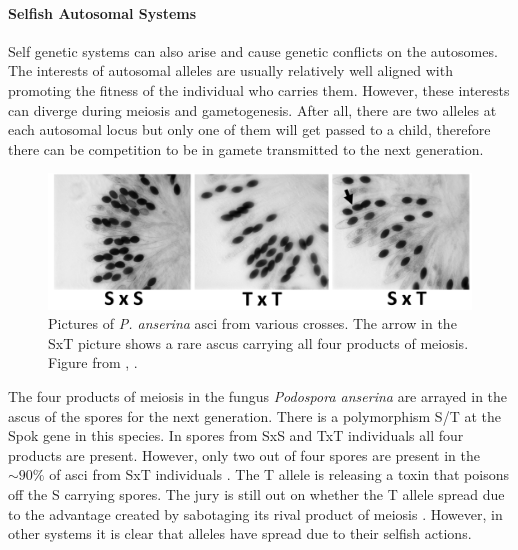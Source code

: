 {\paragraph{Selfish Autosomal Systems}
Self genetic systems can also arise and cause genetic conflicts on the
autosomes. The interests of autosomal alleles are usually relatively
well aligned with promoting the fitness of the individual who carries them. However, these interests can
diverge during meiosis and gametogenesis. After all, there are two
alleles at each autosomal locus but only one of them will get passed
to a child, therefore there can be competition to be in gamete transmitted to the next generation.
 \begin{figure}
\begin{center}
\includegraphics[width= \textwidth]{Journal_figs/single_locus_selection/ascus_spore_killer/Grognet_spore_killer.png}
\end{center}
\caption{
Pictures of {\it P. anserina} asci from various crosses. The arrow in the
SxT picture shows a rare  ascus carrying all four products of
meiosis. Figure from \citet{grognet2014genes}, \PLOSccBY. 
 } \label{fig:spore_killer}
\end{figure}
  

The four products of meiosis in the fungus {\it Podospora anserina}
are arrayed in the ascus
of the spores for the next generation. There is a polymorphism S/T at
the Spok gene in this species. In
spores from SxS and TxT individuals all four products are
present. However, only two out of four spores are present in the
$\sim 90\%$ of asci from SxT individuals \citep{grognet2014genes}. The T allele is releasing
a toxin that poisons off the S carrying spores. The jury is still out
on whether the T allele spread due to the advantage created by
sabotaging its rival product of meiosis \citep{sweigart2019making}. However, in other systems it
is clear that alleles have spread due to their selfish actions. 

}
